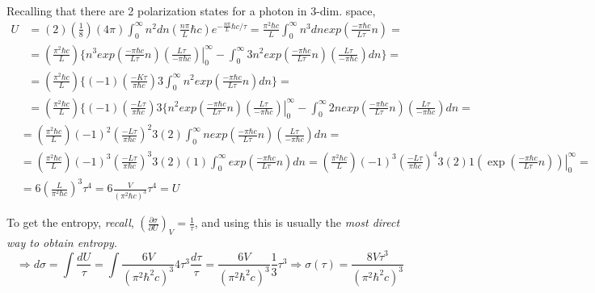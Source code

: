 Recalling that there are 2 polarization states for a photon in 3-dim. space,
\[
\begin{aligned}
  U & = (2) \left( \frac{1}{8} \right) (4\pi ) \int_0^{\infty} n^2 dn \left( \frac{n \pi }{L} \hbar c \right) e^{ - \frac{ n \pi}{L} \hbar c /\tau } = \frac{\pi^2 \hbar c }{L } \int_0^{\infty} n^3 dn exp{ \left( \frac{- \pi \hbar c}{ L \tau} n \right) } = \\
& = \left( \frac{ \pi^2 \hbar c}{L} \right) \lbrace \left. n^3 exp{ \left( \frac{ - \pi \hbar c}{ L \tau } n \right) } \left( \frac{ L \tau }{ -\pi \hbar c} \right) \right|_0^{\infty} - \int_0^{\infty} 3n^2 exp{ \left( \frac{ - \pi \hbar c}{ L \tau } n \right) } \left( \frac{ L \tau }{ -\pi \hbar c} \right) dn \rbrace = \\
  & = \left( \frac{\pi^2 \hbar c}{L} \right) \lbrace (-1) \left( \frac{ - K \tau}{\pi \hbar c} \right) 3 \int_0^{\infty} n^2 exp{ \left( \frac{ - \pi \hbar c}{ L \tau } n \right) } dn \rbrace = \\
  & = \left( \frac{ \pi^2  \hbar c}{L} \right) \lbrace (-1) \left( \frac{-L \tau}{\pi \hbar c} \right)3 \lbrace \left. n^2 exp{ \left( \frac{ - \pi \hbar c}{ L \tau } n \right) } \left( \frac{ L \tau }{ -\pi \hbar c} \right) \right|_0^{\infty} - \int_0^{\infty} 2n exp{ \left( \frac{ - \pi \hbar c}{ L \tau } n \right) } \left( \frac{ L \tau }{ -\pi \hbar c} \right) dn = 
\end{aligned} 
\]
\[
\begin{aligned} 
 & = \left( \frac{ \pi^2 \hbar c}{L} \right) (-1)^2 \left( \frac{ - L \tau}{ \pi \hbar c } \right)^2 3 (2) \int_0^{\infty} n exp{ \left( \frac{ - \pi \hbar c}{ L \tau } n \right) } \left( \frac{ L \tau }{ -\pi \hbar c} \right) dn = \\
  & = \left( \frac{\pi^2 \hbar c}{L} \right)(-1)^3 \left( \frac{ -L \tau}{\pi \hbar c} \right)^3 3(2)(1) \int_0^{\infty } exp{ \left( \frac{ - \pi \hbar c}{ L \tau } n \right) } dn = \left( \frac{\pi^2 \hbar c}{L} \right)(-1)^3 \left( \frac{-L \tau}{\pi \hbar c} \right)^4 3(2)1 \left. \left( \exp{ \left( \frac{-\pi \hbar c}{ L \tau} n \right) } \right) \right|_0^{\infty} = \\
  & = 6 \left( \frac{ L }{ \pi^2 \hbar c } \right)^3 \tau^4 = \boxed{ 6 \frac{ V}{ (\pi^2 \hbar c )^3} \tau^4  = U }
\end{aligned}
\]

To get the entropy, \emph{recall}, $\left( \frac{ \partial \sigma}{ \partial U} \right)_V = \frac{1}{\tau}$, and using this is usually the \emph{most direct way to obtain entropy}.
\[
\Longrightarrow d\sigma = \int \frac{dU}{ \tau} = \int \frac{6V}{ (\pi^2 \hbar^2 c)^3 } 4 \tau^3 \frac{d\tau}{ \tau} = \frac{6V}{ (\pi^2 \hbar^2 c)^3} \frac{1}{3} \tau^3 \Longrightarrow \boxed{ \sigma(\tau) = \frac{ 8 V \tau^3 }{ (\pi^2 \hbar^2 c)^3 } }
\]  

